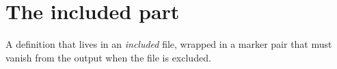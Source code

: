 \section{The included part}

\begin{definition}[Excluded]
  A definition that lives in an \emph{included} file, wrapped in a marker
  pair that must vanish from the output when the file is excluded.
\end{definition}
